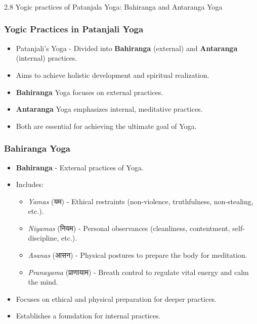 \begin{frame}[fragile]\frametitle{}
\begin{center}
{\Large 2.8  Yogic practices of Patanjala Yoga: Bahiranga and Antaranga Yoga}
\end{center}
\end{frame}

\begin{frame}[fragile]\frametitle{Yogic Practices in Patanjali Yoga}

      \begin{itemize}
		\item Patanjali’s Yoga - Divided into \textbf{Bahiranga} (external) and \textbf{Antaranga} (internal) practices.
		\item Aims to achieve holistic development and spiritual realization.
		\item \textbf{Bahiranga} Yoga focuses on external practices.
		\item \textbf{Antaranga} Yoga emphasizes internal, meditative practices.
		\item Both are essential for achieving the ultimate goal of Yoga.
	  \end{itemize}

\end{frame}

\begin{frame}[fragile]\frametitle{Bahiranga Yoga}

      \begin{itemize}
		\item \textbf{Bahiranga} - External practices of Yoga.
		\item Includes:
		  \begin{itemize}
		      \item \textit{Yamas} (यम) - Ethical restraints (non-violence, truthfulness, non-stealing, etc.).
		      \item \textit{Niyamas} (नियम) - Personal observances (cleanliness, contentment, self-discipline, etc.).
		      \item \textit{Asanas} (आसन) - Physical postures to prepare the body for meditation.
		      \item \textit{Pranayama} (प्राणायाम) - Breath control to regulate vital energy and calm the mind.
		  \end{itemize}
		\item Focuses on ethical and physical preparation for deeper practices.
		\item Establishes a foundation for internal practices.
	  \end{itemize}

\end{frame}

